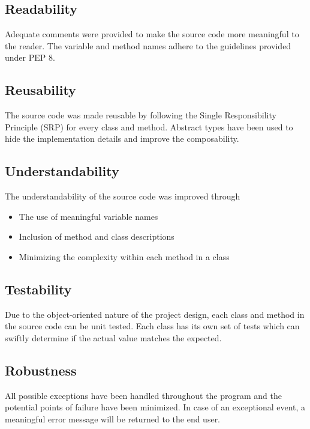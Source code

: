   \subsection{Readability}
    \begin{flushleft}
      Adequate comments were provided to make the source code more meaningful to the reader. The variable and method names adhere to the guidelines provided under PEP 8. 
    \end{flushleft}

  \subsection{Reusability}
    \begin{flushleft}
      The source code was made reusable by following the Single Responsibility Principle (SRP) for every class and method. Abstract types have been used to hide the implementation details and improve the composability.
    \end{flushleft}

  \subsection{Understandability}
    \begin{flushleft}
      The understandability of the source code was improved through
      \begin{itemize}
        \item {The use of meaningful variable names}
        \item {Inclusion of method and class descriptions}
        \item {Minimizing the complexity within each method in a class}
      \end{itemize}
    \end{flushleft}

  \subsection{Testability}
    \begin{flushleft}
      Due to the object-oriented nature of the project design, each class and method in the source code can be unit tested. Each class has its own set of tests which can swiftly determine if the actual value matches the expected.
    \end{flushleft}

  \subsection{Robustness}
  \begin{flushleft}
    All possible exceptions have been handled throughout the program and the potential points of failure have been minimized. In case of an exceptional event, a meaningful error message will be returned to the end user.
  \end{flushleft}

